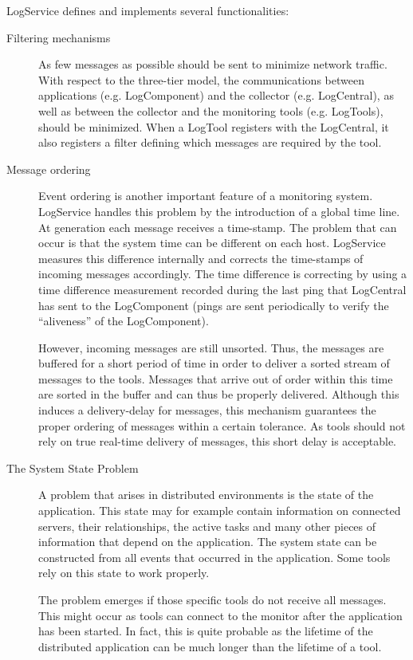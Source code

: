 \noindent
LogService defines and implements several functionalities:
\begin{description}
  \item[Filtering mechanisms] As few messages as possible should be sent to
    minimize network traffic.  With respect to the three-tier model, the
    communications between applications (e.g. LogComponent) and the collector
    (e.g. LogCentral), as well as between the collector and the monitoring
    tools (e.g. LogTools), should be minimized.  When a LogTool registers with
    the LogCentral, it also registers a filter defining which messages are
    required by the tool.
  \item[Message ordering] Event ordering is another important feature of a
    monitoring system. LogService handles this problem by the introduction of a
    global time line. At generation each message receives a time-stamp. The
    problem that can occur is that the system time can be different on each
    host. LogService measures this difference internally and corrects the
    time-stamps of incoming messages accordingly. The time difference is
    correcting by using a time difference measurement recorded during the last
    ping that LogCentral has sent to the LogComponent (pings are sent
    periodically to verify the ``aliveness'' of the LogComponent).

    However, incoming messages are still unsorted. Thus, the messages are
    buffered for a short period of time in order to deliver a sorted stream of
    messages to the tools.  Messages that arrive out of order within this time
    are sorted in the buffer and can thus be properly delivered.  Although this
    induces a delivery-delay for messages, this mechanism guarantees the proper
    ordering of messages within a certain tolerance.  As tools should not rely
    on true real-time delivery of messages, this short delay is acceptable.
    
  \item[The System State Problem] A problem that arises in distributed
    environments is the state of the application. This state may for example
    contain information on connected servers, their relationships, the active
    tasks and many other pieces of information that depend on the application.
    The system state can be constructed from all events that occurred in the
    application. Some tools rely on this state to work properly.

    The problem emerges if those specific tools do not receive all messages.
    This might occur as tools can connect to the monitor after the application
    has been started.  In fact, this is quite probable as the lifetime of the
    distributed application can be much longer than the lifetime of a tool.


\end{description}
